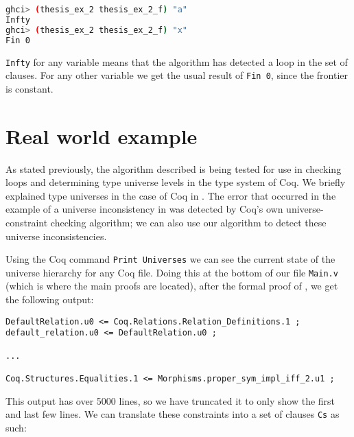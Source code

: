 \begin{minipage}{\linewidth}
\begin{lstlisting}[language=bash, label={lst:loop_checking_example_output}, caption={Loop-checking example output}]
ghci> (thesis_ex_2 thesis_ex_2_f) "a"
Infty
ghci> (thesis_ex_2 thesis_ex_2_f) "x"
Fin 0
\end{lstlisting}
\end{minipage}

\lstinline{Infty} for any variable means that the algorithm has detected a loop in the set of clauses.
For any other variable we get the usual result of \lstinline{Fin 0}, since the frontier is constant.

\section{Real world example}
\label{sec:real_world_example}

As stated previously, the algorithm described  is being
tested for use in checking loops and determining type universe levels in the
type system of Coq.
We briefly explained type universes in the case of Coq in .
The error that occurred in the example of a universe inconsistency in 
was detected by Coq's own universe-constraint checking algorithm;
we can also use our algorithm to detect these universe inconsistencies.

Using the Coq command \lstinline{Print Universes} we can see the current state of the universe hierarchy for any Coq file.
Doing this at the bottom of our file \lstinline{Main.v} (which is where the main proofs are located),
after the formal proof of , we get the following output:

\begin{minipage}{\linewidth}
\begin{lstlisting}[language=Coq, label={lst:universe_hierarchy}, caption={Universe hierarchy in \lstinline{Main.v}}]
DefaultRelation.u0 <= Coq.Relations.Relation_Definitions.1 ;
default_relation.u0 <= DefaultRelation.u0 ;

...

Coq.Structures.Equalities.1 <= Morphisms.proper_sym_impl_iff_2.u1 ;
\end{lstlisting}
\end{minipage}

This output has over 5000 lines, so we have truncated it to only show the first and last few lines.
We can translate these constraints into a set of clauses \lstinline{Cs} as such:


